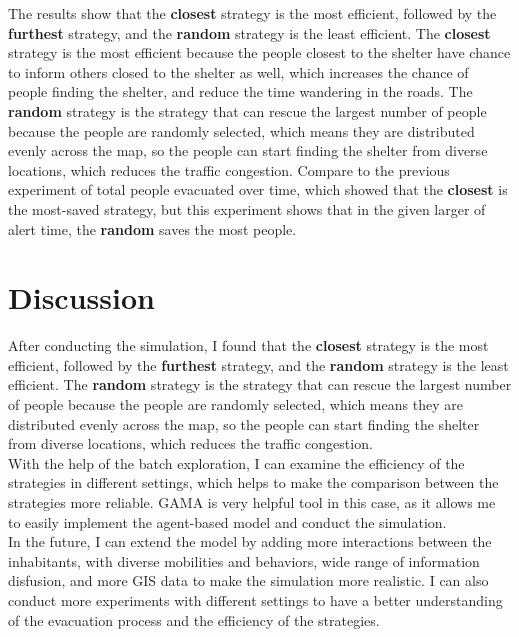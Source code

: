\documentclass[12pt]{article}
\begin{document}
The results show that the \textbf{closest} strategy is the most efficient, followed by the \textbf{furthest} strategy, and the \textbf{random} strategy is the least efficient. The \textbf{closest} strategy is the most efficient because the people closest to the shelter have chance to inform others closed to the shelter as well, which increases the chance of people finding the shelter, and reduce the time wandering in the roads. The \textbf{random} strategy is the strategy that can rescue the largest number of people because the people are randomly selected, which means they are distributed evenly across the map, so the people can start finding the shelter from diverse locations, which reduces the traffic congestion. Compare to the previous experiment of total people evacuated over time, which showed that the \textbf{closest} is the most-saved strategy, but this experiment shows that in the given larger of alert time, the \textbf{random} saves the most people.\\

\section{Discussion}

After conducting the simulation, I found that the \textbf{closest} strategy is the most efficient, followed by the \textbf{furthest} strategy, and the \textbf{random} strategy is the least efficient.  The \textbf{random} strategy is the strategy that can rescue the largest number of people because the people are randomly selected, which means they are distributed evenly across the map, so the people can start finding the shelter from diverse locations, which reduces the traffic congestion. \\

With the help of the batch exploration, I can examine the efficiency of the strategies in different settings, which helps to make the comparison between the strategies more reliable. GAMA is very helpful tool in this case, as it allows me to easily implement the agent-based model and conduct the simulation. \\

In the future, I can extend the model by adding more interactions between the inhabitants, with diverse mobilities and behaviors, wide range of information disfusion, and more GIS data to make the simulation more realistic. I can also conduct more experiments with different settings to have a better understanding of the evacuation process and the efficiency of the strategies.\\
\end{document}
